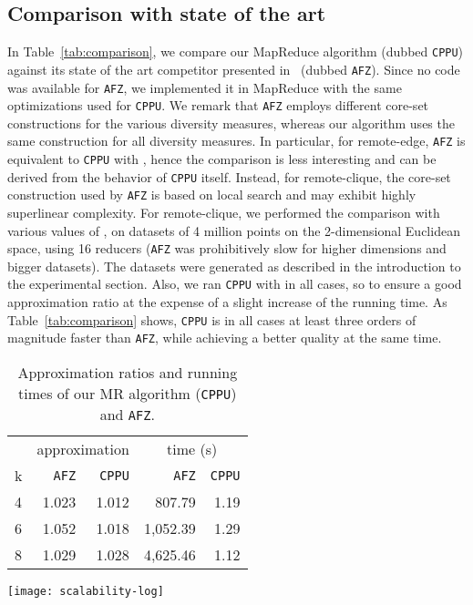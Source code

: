 \documentclass{article}
\begin{document}
\subsection{Comparison with state of the art}

In Table~\ref{tab:comparison}, we compare our MapReduce algorithm
(dubbed {\tt CPPU}) against its state of the art competitor presented
in~\cite{AghamolaeiFZ15} (dubbed {\tt AFZ}). Since no code was
available for {\tt AFZ}, we implemented it in MapReduce with the same
optimizations used for {\tt CPPU}.  We remark that {\tt AFZ} employs
different core-set constructions for the various diversity measures,
whereas our algorithm uses the same construction for all diversity
measures.  In particular, for remote-edge, {\tt AFZ} is equivalent to
{\tt CPPU} with , hence the comparison 
is less interesting and can be derived from the behavior
of {\tt CPPU} itself. Instead, for remote-clique, the core-set
construction used by {\tt AFZ} is based on local search and may
exhibit highly superlinear complexity.  For remote-clique, we
performed the comparison with various values of , on datasets of 4
million points on the 2-dimensional Euclidean space, using 16 reducers
({\tt AFZ} was prohibitively slow for higher dimensions and bigger
datasets).  The datasets were generated as described in the
introduction to the experimental section. Also, we ran {\tt CPPU} with
 in all cases, so to ensure a good approximation ratio at the
expense of a slight increase of the running time.
As Table~\ref{tab:comparison} shows, {\tt CPPU} is in all cases at least
three orders of magnitude faster than {\tt AFZ}, while achieving a better quality at the same time.


\begin{table}[t]
  \begin{minipage}{.43\linewidth}
    \centering
    \begin{tabular}{lrrrr}
      \toprule
      & \multicolumn{2}{c}{approximation} & \multicolumn{2}{c}{time (s)} \\
      k & {\tt AFZ} & {\tt CPPU} & {\tt AFZ} & {\tt CPPU} \\
      \midrule
      4 &        1.023 &     1.012 &     807.79 &  1.19 \\
      6 &        1.052 &     1.018 &    1,052.39 & 1.29 \\
      8 &        1.029 &     1.028 &    4,625.46 & 1.12 \\
      \bottomrule
    \end{tabular}
    \caption{Approximation ratios and running times
      of our MR algorithm ({\tt CPPU}) and {\tt AFZ}.}
    \label{tab:comparison}
  \end{minipage}
  \hfill
  \begin{minipage}{.54\linewidth}
    \centering
    \texttt{[image: scalability-log]}
    \label{fig:scalability}
  \end{minipage}
\end{table}
\end{document}
